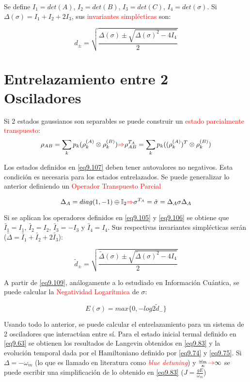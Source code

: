 \documentclass{book}
\begin{document}
Se define $I_1=det(A)$, $I_2=det(B)$, $I_3=det(C)$, $I_4=det(\sigma)$. Si $\Delta(\sigma)=I_1+I_2+2I_3$, sus \textcolor{red}{invariantes simplécticas} son:

\begin{equation}\label{eq9.106}d_\pm=\sqrt{\frac{\Delta(\sigma)\pm\sqrt{\Delta(\sigma)^2-4I_4}}{2}}\end{equation}
\section{Entrelazamiento entre 2 Osciladores}

Si 2 estados gaussianos son separables se puede construir un \textcolor{red}{estado parcialmente transpuesto}: 
\begin{equation}\label{eq9.107}\rho_{AB}=\sum_kp_k(\rho_k^{(A)}\otimes\rho_k^{(B)})\textcolor{red}{\Rightarrow} \rho_{AB}^{T_A}=\sum_kp_k((\rho_k^{(A)})^T\otimes\rho_k^{(B)})\end{equation}

Los estados definidos en \ref{eq9.107} deben tener autovalores no negativos. Esta condición es necesaria para los estados entrelazados. Se puede generalizar lo anterior definiendo un \textcolor{red}{Operador Transpuesto Parcial}

\begin{equation}\label{eq9.108}\Delta_A=diag(1,-1)\oplus\mathbb{I}_2\textcolor{red}{\Rightarrow} \sigma^{T_A}=\tilde{\sigma}=\Delta_A\sigma\Delta_A\end{equation}

Si se aplican los operadores definidos en \ref{eq9.105} y \ref{eq9.106} se obtiene que $\tilde{I_1}=I_1$, $\tilde{I_2}=I_2$, $\tilde{I_3}=-I_3$ y $\tilde{I_4}=I_4$. Sus respectivas invariantes simplécticas serán ($\tilde{\Delta}=\tilde{I_1}+\tilde{I_2}+2\tilde{I_3}$):

\begin{equation}\label{eq9.109}\tilde{d}_\pm=\sqrt{\frac{\tilde{\Delta}(\sigma)\pm\sqrt{\tilde{\Delta}(\sigma)^2-4I_4}}{2}}\end{equation}

A partir de \ref{eq9.109}, análogamente a lo estudiado en Información Cuántica, se puede calcular la \textcolor{red}{Negatividad Logarítmica} de $\sigma$:

\begin{equation}\label{eq9.110}E(\sigma)=max\{0,-log 2\tilde{d}_-\}\end{equation}

Usando todo lo anterior, se puede calcular el entrelazamiento para un sistema de 2 osciladores que interactúan entre sí. Para el estado inicial termal definido en \ref{eq9.63} se obtienen los resultados de Langevin obtenidos en \ref{eq9.83} y la evolución temporal dada por el Hamiltoniano definido por \ref{eq9.74} y \ref{eq9.75}. Si $\Delta=-\omega_m$ (lo que es llamado en literatura como \textcolor{red}{\textit{blue detuning}}) y $\frac{\omega_m}{\kappa}\textcolor{red}{\rightarrow}\infty$ se puede escribir una simplificación de lo obtenido en \ref{eq9.83} ($J=\frac{gE}{\omega_m}$)
\end{document}
